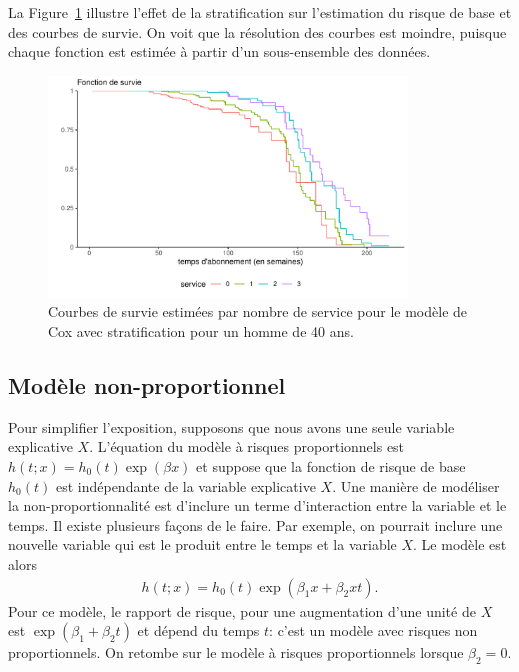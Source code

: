 \documentclass[
  11pt,
  letterpaper,
]{scrbook}
\theoremstyle{definition}
\theoremstyle{remark}
\begin{document}
La Figure~\ref{fig-courbesurviesstrat} illustre l'effet de la
stratification sur l'estimation du risque de base et des courbes de
survie. On voit que la résolution des courbes est moindre, puisque
chaque fonction est estimée à partir d'un sous-ensemble des données.

\begin{figure}[ht!]

{\centering \includegraphics[width=0.85\textwidth,height=\textheight]{./06-survie_files/figure-pdf/fig-courbesurviesstrat-1.pdf}

}

\caption{\label{fig-courbesurviesstrat}Courbes de survie estimées par
nombre de service pour le modèle de Cox avec stratification pour un
homme de 40 ans.}

\end{figure}

\hypertarget{moduxe8le-non-proportionnel}{%
\subsection{Modèle
non-proportionnel}\label{moduxe8le-non-proportionnel}}

Pour simplifier l'exposition, supposons que nous avons une seule
variable explicative \(X\). L'équation du modèle à risques
proportionnels est \(h(t; x) = h_0(t)\exp(\beta x)\) et suppose que la
fonction de risque de base \(h_0(t)\) est indépendante de la variable
explicative \(X\). Une manière de modéliser la non-proportionnalité est
d'inclure un terme d'interaction entre la variable et le temps. Il
existe plusieurs façons de le faire. Par exemple, on pourrait inclure
une nouvelle variable qui est le produit entre le temps et la variable
\(X\). Le modèle est alors \begin{align*}
h(t; x) = h_0(t) \exp(\beta_1x + \beta_2xt).
\end{align*} Pour ce modèle, le rapport de risque, pour une augmentation
d'une unité de \(X\) est \(\exp(\beta_1+ \beta_2t)\) et dépend du temps
\(t\): c'est un modèle avec risques non proportionnels. On retombe sur
le modèle à risques proportionnels lorsque \(\beta_2=0\).
\end{document}
